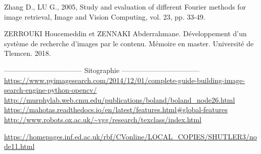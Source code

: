 \documentclass[
openany,
11pt, %
french, %
singlespacing, %
headsepline, %
]{MastersDoctoralThesis} %
\begin{document}
\begin{thebibliography}{widest entry}
	 Zhang D., LU G., 2005, Study and evaluation of different Fourier methods for image retrieval, Image and Vision Computing, vol. 23, pp. 33-49.
	
	  ZERROUKI Houcemeddin et ZENNAKI Abderrahmane. Développement d’un système de recherche d’images par le contenu. Mémoire en master. Université de Tlemcen. 2018.
	
	
	--------------------------------- Sitographie ---------------------------------
	 \url{https://www.pyimagesearch.com/2014/12/01/complete-guide-building-image-search-engine-python-opencv/}
	 \url{http://murphylab.web.cmu.edu/publications/boland/boland_node26.html}
	 \url{https://mahotas.readthedocs.io/en/latest/features.html#global-features}
	 \url{http://www.robots.ox.ac.uk/~vgg/research/texclass/index.html}
	
	 \url{https://homepages.inf.ed.ac.uk/rbf/CVonline/LOCAL_COPIES/SHUTLER3/node11.html}
	
\end{thebibliography}
\end{document}
